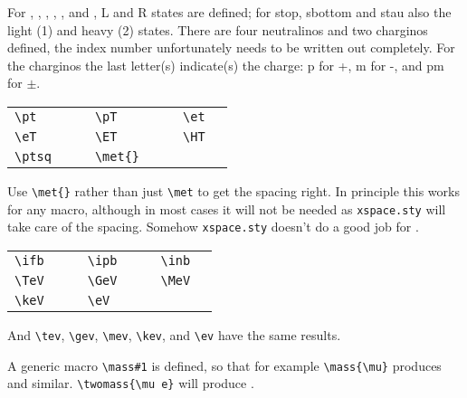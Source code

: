 \documentclass{../atlasnote}
\begin{document}
\medskip

\noindent For , , , \slepton, \sel, \smu and
\stau, L and R states are defined; for stop, sbottom and stau also the
light (1) and heavy (2) states. There are four neutralinos and two
charginos defined, the index number unfortunately needs to be written
out completely. For the charginos the last letter(s) indicate(s) the
charge: p for +, m for -, and pm for $\pm$.

\medskip

\begin{tabular}{llcllcll}
  \verb+\pt+ & \pt{} & \hspace{1cm} &
  \verb+\pT+ & \pT{} & \hspace{1cm} &
  \verb+\et+ & \et{} \\
  \verb+\eT+ & \eT{} & &
  \verb+\ET+ & \ET{} & &
  \verb+\HT+ & \HT{} \\
  \verb+\ptsq+ & \ptsq{} & &
  \verb+\met{}+ & \met{} & &
\end{tabular}

\medskip

\noindent Use \verb+\met{}+ rather than just \verb+\met+ to get the spacing
right. In principle this works for any macro, although in most cases it will
not be needed as {\tt xspace.sty} will take care of the spacing. Somehow
{\tt xspace.sty} doesn't do a good job for \met.

\vspace{5mm}

\begin{tabular}{llcllcll}
\verb+\ifb+ & \ifb{} & \hspace{1cm} &
\verb+\ipb+ & \ipb{} & \hspace{1cm} &
\verb+\inb+ & \inb{} \\
\verb+\TeV+ & \TeV{} & &
\verb+\GeV+ & \GeV{} & &
\verb+\MeV+ & \MeV{} \\
\verb+\keV+ & \keV{} & &
\verb+\eV+ & \eV{} & & & \\
\end{tabular}

\medskip

\noindent And \verb+\tev+, \verb+\gev+, \verb+\mev+, \verb+\kev+, and
\verb+\ev+ have the same results.

\medskip

\noindent A generic macro \verb+\mass#1+ is defined, so that for example
\verb+\mass{\mu}+ produces \mass{\mu} and similar.
\verb+\twomass{\mu e}+ will produce .
\end{document}
